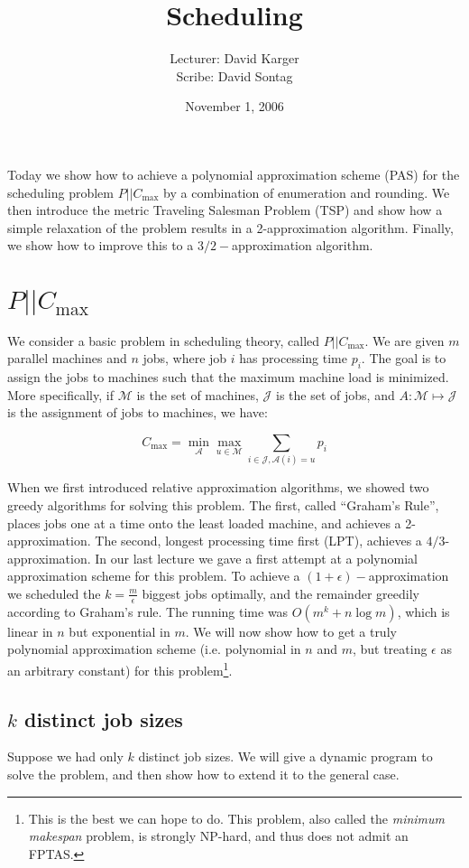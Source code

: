 \documentclass{article}
\title{Scheduling}
\date{November 1, 2006}
\author{Lecturer: David Karger\\ Scribe: David Sontag}
\begin{document}
Today we show how to achieve a polynomial approximation scheme (PAS)
for the scheduling problem $P || C_{\textrm{max}}$ by a combination of
enumeration and rounding. We then introduce the metric Traveling
Salesman Problem (TSP) and show how a simple relaxation of the problem
results in a 2-approximation algorithm. Finally, we show how to
improve this to a $3/2-$approximation algorithm.


\section{$P || C_{\textrm{max}}$}

We consider a basic problem in scheduling theory, called $P ||
C_{\textrm{max}}$. We are given $m$ parallel machines and $n$ jobs,
where job $i$ has processing time $p_i$. The goal is to assign the
jobs to machines such that the maximum machine load is minimized. More
specifically, if $\mathcal{M}$ is the set of machines, $\mathcal{J}$
is the set of jobs, and $A : \mathcal{M} \mapsto \mathcal{J}$ is the
assignment of jobs to machines, we have:

$$C_{\textrm{max}} = \min_{\mathcal{A}} \max_{u \in \mathcal{M}} \sum_{i\in \mathcal{J}, \mathcal{A}(i)=u}{p_i}$$

When we first introduced relative approximation algorithms, we showed
two greedy algorithms for solving this problem. The first, called
``Graham's Rule'', places jobs one at a time onto the least loaded
machine, and achieves a 2-approximation. The second, longest
processing time first (LPT), achieves a $4/3$-approximation. In our
last lecture we gave a first attempt at a polynomial approximation
scheme for this problem. To achieve a $(1+\epsilon)-$approximation we
scheduled the $k=\frac{m}{\epsilon}$ biggest jobs optimally, and the
remainder greedily according to Graham's rule. The running time was
$O(m^k + n\log{m})$, which is linear in $n$ but exponential in $m$. We
will now show how to get a truly polynomial approximation scheme
(i.e. polynomial in $n$ and $m$, but treating $\epsilon$ as an
arbitrary constant) for this problem\footnote{This is the best we can
hope to do. This problem, also called the {\em minimum makespan}
problem, is strongly NP-hard, and thus does not admit an FPTAS.}.

\subsection{$k$ distinct job sizes}

Suppose we had only $k$ distinct job sizes. We will give a dynamic
program to solve the problem, and then show how to extend it to the
general case.
\end{document}

